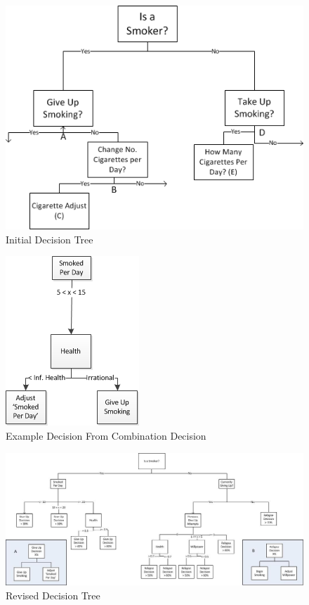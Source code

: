 \documentclass[]{report}
\begin{document}
\begin{figure}
\begin{center}
\includegraphics[scale=0.8]{DecTreeBasic2.png}
\end{center}
\caption{Initial Decision Tree}
\label{img:init-dectree}
\end{figure}

\begin{figure}
\begin{center}
\includegraphics[scale=1]{example-decision.png}
\end{center}
\caption{Example Decision From Combination Decision}
\label{img:example-decision}
\end{figure}

\begin{landscape}
\begin{figure}
\begin{center}
\includegraphics[width=\paperwidth,keepaspectratio]{DecTreev09.jpg}
\caption{Revised Decision Tree}
\end{center}
\label{img:0.9-dectree}
\end{figure}
\end{landscape}
\end{document}
